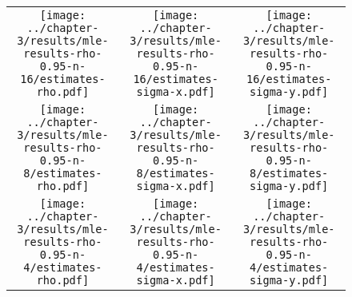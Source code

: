 \begin{figure}
  \centering
  \begin{tabular}{ccc}
    \begin{minipage}{0.3\textwidth}
      \centering
      \texttt{[image: ../chapter-3/results/mle-results-rho-0.95-n-16/estimates-rho.pdf]}
    \end{minipage}
    & \begin{minipage}{0.3\textwidth}
      \centering
      \texttt{[image: ../chapter-3/results/mle-results-rho-0.95-n-16/estimates-sigma-x.pdf]}
    \end{minipage}
    & \begin{minipage}{0.3\textwidth}
      \centering
      \texttt{[image: ../chapter-3/results/mle-results-rho-0.95-n-16/estimates-sigma-y.pdf]}
    \end{minipage} \\
    \begin{minipage}{0.3\textwidth}
      \centering
      \texttt{[image: ../chapter-3/results/mle-results-rho-0.95-n-8/estimates-rho.pdf]}
    \end{minipage}
    & \begin{minipage}{0.3\textwidth}
      \centering
      \texttt{[image: ../chapter-3/results/mle-results-rho-0.95-n-8/estimates-sigma-x.pdf]}
    \end{minipage}
    & \begin{minipage}{0.3\textwidth}
      \centering
      \texttt{[image: ../chapter-3/results/mle-results-rho-0.95-n-8/estimates-sigma-y.pdf]}
    \end{minipage} \\
    \begin{minipage}{0.3\textwidth}
      \centering
      \texttt{[image: ../chapter-3/results/mle-results-rho-0.95-n-4/estimates-rho.pdf]}
    \end{minipage}
    & \begin{minipage}{0.3\textwidth}
      \centering
      \texttt{[image: ../chapter-3/results/mle-results-rho-0.95-n-4/estimates-sigma-x.pdf]}
    \end{minipage}
    & \begin{minipage}{0.3\textwidth}
      \centering
      \texttt{[image: ../chapter-3/results/mle-results-rho-0.95-n-4/estimates-sigma-y.pdf]}
    \end{minipage}
  \end{tabular}

\end{figure}
